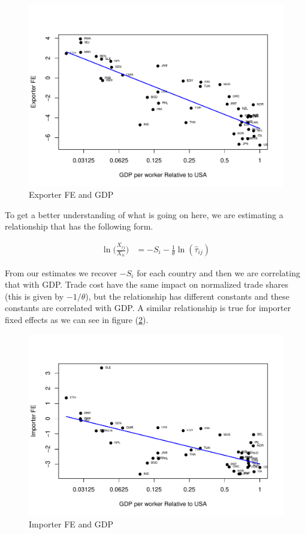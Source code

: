 \documentclass[a4paper,12pt]{article}
\begin{document}
\begin{figure}[htbp!]
     \centering
     \includegraphics[scale=0.75]{exporter_FE_and_GDP.pdf}
     \caption{Exporter FE and GDP}
     \label{exporterFEandGDP}
 \end{figure}
 
 To get a better understanding of what is going on here, we are estimating a relationship that has the following form. 
 
 \begin{align}
     \ln\bigg(\frac{X_{ij}}{X_{ii}}\bigg) & = - S_i - \frac{1}{\theta} \ln(\hat{\tau}_{ij})
 \end{align}
 
 From our estimates we recover $-S_i$ for each country and then we are correlating that with GDP. Trade cost have the same impact on normalized trade shares (this is given by $-1/\theta$), but the relationship has different constants and these constants are correlated with GDP. A similar relationship is true for importer fixed effects as we can see in figure (\ref{importerFEandGDP}). %
 
 
 
 
 \begin{figure}[htbp!]
     \centering
     \includegraphics[scale=0.75]{importer_FE_and_GDP.pdf}
     \caption{Importer FE and GDP}
     \label{importerFEandGDP}
 \end{figure}
 
\end{document}

